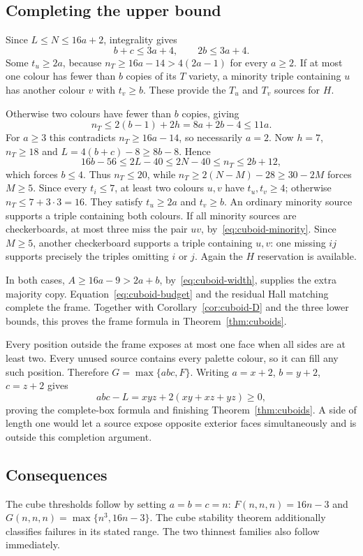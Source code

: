 \subsection{Completing the upper bound}
Since $L\le N\le16a+2$, integrality gives
\begin{equation}\label{eq:cuboid-width}
 b+c\le3a+4,\qquad 2b\le3a+4.
\end{equation}
Some $t_u\ge2a$, because $n_T\ge16a-14>4(2a-1)$ for every $a\ge2$.
If at most one colour has fewer than $b$ copies of its $T$ variety, a
minority triple containing $u$ has another colour $v$ with $t_v\ge b$.
These provide the $T_u$ and $T_v$ sources for $H$.

Otherwise two colours have fewer than $b$ copies, giving
\[
 n_T\le2(b-1)+2h=8a+2b-4\le11a.
\]
For $a\ge3$ this contradicts $n_T\ge16a-14$, so necessarily $a=2$.
Now $h=7$, $n_T\ge18$ and $L=4(b+c)-8\ge8b-8$. Hence
\[
 16b-56\le2L-40\le2N-40\le n_T\le2b+12,
\]
which forces $b\le4$. Thus $n_T\le20$, while
$n_T\ge2(N-M)-28\ge30-2M$ forces $M\ge5$.
Since every $t_i\le7$, at least two colours $u,v$ have $t_u,t_v\ge4$;
otherwise $n_T\le7+3\cdot3=16$. They satisfy $t_u\ge2a$ and $t_v\ge b$.
An ordinary minority source supports a triple containing both colours.
If all minority sources are checkerboards, at most three miss the pair
$uv$, by~\eqref{eq:cuboid-minority}. Since $M\ge5$, another checkerboard
supports a triple containing $u,v$: one missing $ij$ supports precisely
the triples omitting $i$ or $j$. Again the $H$ reservation is available.

In both cases, $A\ge16a-9>2a+b$, by~\eqref{eq:cuboid-width}, supplies the
extra majority copy. Equation~\eqref{eq:cuboid-budget} and the residual
Hall matching complete the frame. Together with
Corollary~\ref{cor:cuboid-D} and the three lower bounds, this proves the
frame formula in Theorem~\ref{thm:cuboids}.

Every position outside the frame exposes at most one face when all sides
are at least two. Every unused source contains every palette colour,
so it can fill any such position. Therefore $G=\max\{abc,F\}$.
Writing $a=x+2$, $b=y+2$, $c=z+2$ gives
\[
 abc-L=xyz+2(xy+xz+yz)\ge0,
\]
proving the complete-box formula and finishing Theorem~\ref{thm:cuboids}.
A side of length one would let a source expose opposite exterior faces
simultaneously and is outside this completion argument.

\subsection{Consequences}
The cube thresholds follow by setting $a=b=c=n$:
$F(n,n,n)=16n-3$ and $G(n,n,n)=\max\{n^3,16n-3\}$.
The cube stability theorem additionally classifies failures in its stated
range. The two thinnest families also follow immediately.


